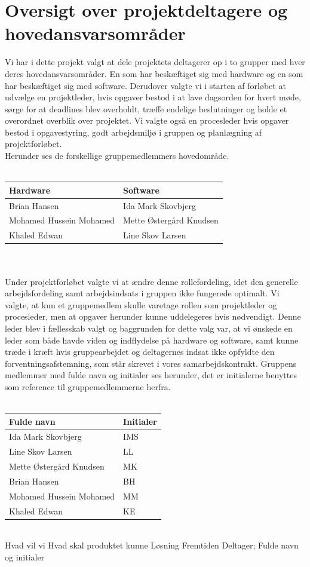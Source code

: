 \section{Oversigt over projektdeltagere og hovedansvarsområder}
Vi har i dette projekt valgt at dele projektets deltagerer op i to grupper med hver deres hovedansvarsområder. En som har beskæftiget sig med hardware og en som har beskæftiget sig med software. Derudover valgte vi i starten af forløbet at udvælge en projektleder, hvis opgaver bestod i at lave dagsorden for hvert møde, sørge for at deadlines blev overholdt, træffe endelige beslutninger og holde et overordnet overblik over projektet. Vi valgte også en procesleder hvis opgaver bestod i opgavestyring, godt arbejdsmiljø i gruppen og planlægning af projektforløbet. \\
Herunder ses de forskellige gruppemedlemmers hovedområde.\\\\
\begin{tabular}{| l | l |} \hline
\textbf{Hardware} & \textbf{Software}\\\hline
Brian Hansen & Ida Mark Skovbjerg \\\hline 
Mohamed Hussein Mohamed & Mette Østergård Knudsen \\\hline
Khaled Edwan & Line Skov Larsen  \\\hline 
\end{tabular}
\\\\
Under projektforløbet valgte vi at ændre denne rollefordeling, idet den generelle arbejdsfordeling samt arbejdsindsats i gruppen ikke fungerede optimalt. Vi valgte, at kun et gruppemedlem skulle varetage rollen som projektleder og procesleder, men at opgaver herunder kunne uddelegeres hvis nødvendigt. Denne leder blev i fællesskab valgt og baggrunden for dette valg var, at vi ønskede en leder som både havde viden og indflydelse på hardware og software, samt kunne træde i kræft hvis gruppearbejdet og deltagernes indsat ikke opfyldte den forventningsafstemning, som står skrevet i vores samarbejdskontrakt. Gruppens medlemmer med fulde navn og initialer ses herunder, det er initialerne benyttes som reference til gruppemedlemmerne herfra. \\\\
\begin{tabular}{| l | l |} \hline
\textbf{Fulde navn} & \textbf{Initialer}\\\hline
Ida Mark Skovbjerg & IMS \\\hline 
Line Skov Larsen & LL \\\hline
Mette Østergård Knudsen & MK  \\\hline 
Brian Hansen & BH \\\hline
Mohamed Hussein Mohamed & MM \\\hline 
Khaled Edwan & KE \\\hline
\end{tabular}
\\
Hvad vil vi
Hvad skal produktet kunne
Løsning
Fremtiden
Deltager; Fulde navn og initialer



